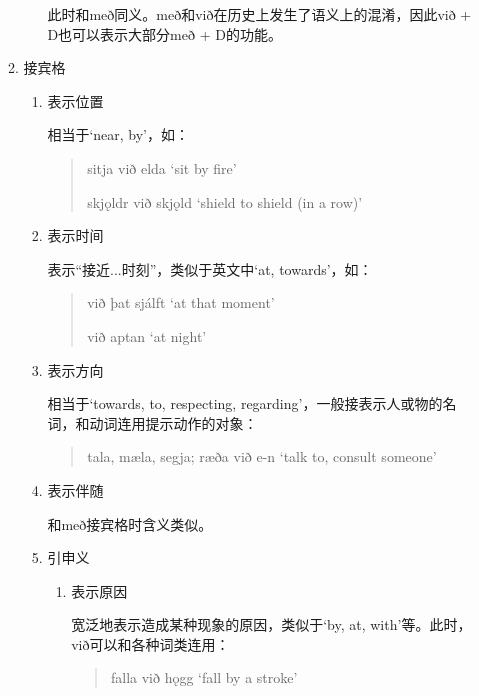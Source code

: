 \begin{enumerate}[itemindent=1em, label=\textbf{\arabic*}.]
\begin{enumerate}
\begin{enumerate}
                              此时和með同义。með和við在历史上发生了语义上的混淆，因此við + D也可以表示大部分með + D的功能。
                    \end{enumerate}

              \item 接宾格
                    \begin{enumerate}
                        \item 表示位置

                              相当于`near, by'，如：
                              \begin{quote}
                                  sitja við elda `sit by fire'

                                  skj\k{o}ldr við skj\k{o}ld `shield to shield (in a row)'
                              \end{quote}

                        \item 表示时间

                              表示“接近...时刻”，类似于英文中`at, towards'，如：
                              \begin{quote}
                                  við þat sjálft `at that moment'

                                  við aptan `at night'
                              \end{quote}

                        \item 表示方向

                              相当于`towards, to, respecting, regarding'，一般接表示人或物的名词，和动词连用提示动作的对象：
                              \begin{quote}
                                  tala, mæla, segja; ræða við e-n `talk to, consult someone'
                              \end{quote}

                        \item 表示伴随

                              和með接宾格时含义类似。

                        \item 引申义
                              \begin{enumerate}
                                  \item 表示原因

                                        宽泛地表示造成某种现象的原因，类似于`by, at, with'等。此时，við可以和各种词类连用：
                                        \begin{quote}
                                            falla við h\k{o}gg `fall by a stroke'


\end{quote}
\end{enumerate}
\end{enumerate}
\end{enumerate}
\end{enumerate}
